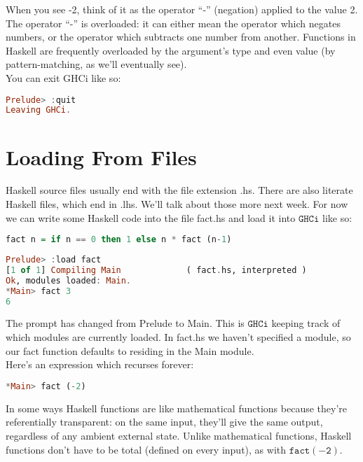 \documentclass[a4paper,12pt]{article}
\newcommand{\keywadj}[1]{\mathtt{#1}}
\begin{document}
\noindent
When you see -2, think of it as the operator ``-'' (negation) applied to the value 2. The operator ``-'' is overloaded: it can either mean the operator which negates numbers, or the operator which subtracts one number from another. Functions in Haskell are frequently overloaded by the argument's type and even value (by pattern-matching, as we'll eventually see). \\

\noindent
You can exit GHCi like so:
\begin{lstlisting}[language=Haskell]
Prelude> :quit
Leaving GHCi.
\end{lstlisting}

\section{Loading From Files}
Haskell source files usually end with the file extension .hs. There are also literate Haskell files, which end in .lhs. We'll talk about those more next week. For now we can write some Haskell code into the file fact.hs and load it into $\keywadj{GHCi}$ like so:
\begin{lstlisting}[language=Haskell]
fact n = if n == 0 then 1 else n * fact (n-1)
\end{lstlisting}

\begin{lstlisting}[language=Haskell]
Prelude> :load fact
[1 of 1] Compiling Main             ( fact.hs, interpreted )
Ok, modules loaded: Main.
*Main> fact 3
6
\end{lstlisting}

\noindent
The prompt has changed from Prelude to Main. This is $\keywadj{GHCi}$ keeping track of which modules are currently loaded. In fact.hs we haven't specified a module, so our fact function defaults to residing in the Main module.\\ 

\noindent
Here's an expression which recurses forever:
\begin{lstlisting}[language=Haskell]
*Main> fact (-2)
\end{lstlisting}

\noindent
In some ways Haskell functions are like mathematical functions because they're referentially transparent: on the same input, they'll give the same output, regardless of any ambient external state. Unlike mathematical functions, Haskell functions don't have to be total (defined on every input), as with $\keywadj{fact (-2)}$. 
\end{document}
